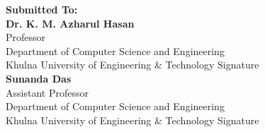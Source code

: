 \begin{titlepage}
\begin{center}
    \begin{flushleft}
    {\fontsize{12}{1.5}\selectfont \textbf{Submitted To:}}\\
    \hspace*{0.8in} %
    {\fontsize{12}{1.5}\selectfont \textbf{Dr. K. M. Azharul Hasan}}\\
    \hspace*{0.8in} %
    {\fontsize{12}{1.5}\selectfont Professor}\\
    \hspace*{0.8in} %
    {\fontsize{12}{1.5}\selectfont Department of Computer Science and Engineering \hspace{.65in}}\\
    \hspace*{0.8in} %
    {\fontsize{12}{1.5}\selectfont Khulna University of Engineering \& Technology \hspace{1in} Signature}\\
     \hspace*{0.8in} %
    {\fontsize{12}{1.5}\selectfont \textbf{Sunanda Das}}\\
    \hspace*{0.8in} %
    {\fontsize{12}{1.5}\selectfont Assistant Professor}\\
    \hspace*{0.8in} %
    {\fontsize{12}{1.5}\selectfont Department of Computer Science and Engineering \hspace{.65in}}\\
    \hspace*{0.8in} %
    {\fontsize{12}{1.5}\selectfont Khulna University of Engineering \& Technology \hspace{1in} Signature}\\
    \end{flushleft}
    \vspace{12pt}
    \vspace{12pt}
    \vspace{12pt}
    \vspace{12pt}
    \vspace{12pt}
    \vspace{12pt}
    \vspace{12pt}
    \vspace{12pt}
    \vspace{12pt}


\end{center}
\end{titlepage}
